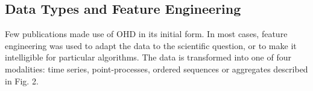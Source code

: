  \subsection{Data Types and Feature Engineering}
    Few publications made use of OHD in its initial form. In most cases, feature engineering was used to adapt the data to the scientific question, or to make it intelligible for particular algorithms. The data is transformed into one of four modalities: time series, point-processes, ordered sequences or aggregates described in Fig. 2.
    
    